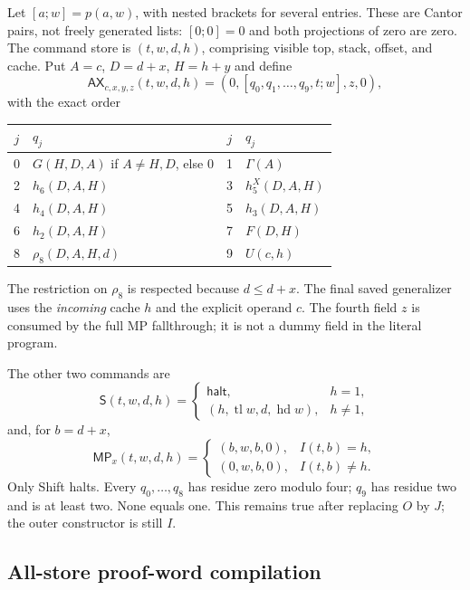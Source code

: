 Let $[a;w]=p(a,w)$, with nested brackets for several entries.  These are
Cantor pairs, not freely generated lists: $[0;0]=0$ and both projections
of zero are zero.  The command store is $(t,w,d,h)$, comprising visible
top, stack, offset, and cache.  Put $A=c$, $D=d+x$, $H=h+y$ and define
\[
 \mathsf{AX}_{c,x,y,z}(t,w,d,h)
       =(0,[q_0,q_1,\ldots,q_9,t;w],z,0),                 \tag{AX}
\]
with the exact order
\begin{center}
\begin{tabular}{@{}clcl@{}}
\toprule
$j$&$q_j$&$j$&$q_j$\\\midrule
0&$G(H,D,A)$ if $A\ne H,D$, else $0$&1&$\Gamma(A)$\\
2&$h_6(D,A,H)$&3&$h_5^X(D,A,H)$\\
4&$h_4(D,A,H)$&5&$h_3(D,A,H)$\\
6&$h_2(D,A,H)$&7&$F(D,H)$\\
8&$\rho_8(D,A,H,d)$&9&$U(c,h)$\\
\bottomrule
\end{tabular}
\end{center}
The restriction on $\rho_8$ is respected because $d\le d+x$.
The final saved generalizer uses the \emph{incoming} cache $h$ and the
explicit operand $c$.  The fourth field $z$ is consumed by the full MP
fallthrough; it is not a dummy field in the literal program.

The other two commands are
\[
 \mathsf S(t,w,d,h)=
 \begin{cases}
 \mathsf{halt},&h=1,\\
 (h,\operatorname{tl}w,d,\operatorname{hd}w),&h\ne1,
 \end{cases}                                             \tag{S}
\]
and, for $b=d+x$,
\[
 \mathsf{MP}_x(t,w,d,h)=
 \begin{cases}
 (b,w,b,0),&I(t,b)=h,\\
 (0,w,b,0),&I(t,b)\ne h.
 \end{cases}                                             \tag{MP}
\]
Only Shift halts.  Every $q_0,\ldots,q_8$ has residue zero modulo four;
$q_9$ has residue two and is at least two.  None equals one.  This remains
true after replacing $O$ by $J$; the outer constructor is still $I$.

\subsection{All-store proof-word compilation}

